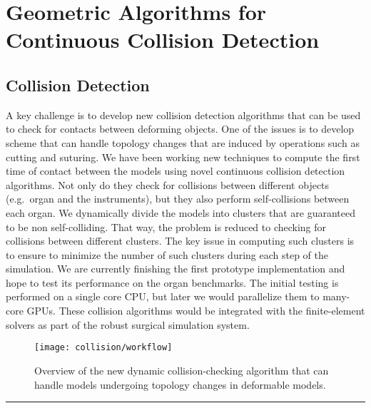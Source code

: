 
\section{Geometric Algorithms for Continuous Collision Detection}\label{sec:continuous_collision}

\subsection{Collision Detection}\label{ssec:collision_detection}
A key challenge is to develop new collision detection algorithms that can be used to check for contacts between deforming objects. One of the issues is to develop scheme that can handle topology changes that are induced by operations such as cutting and suturing. We have been working new techniques to compute the first time of contact between the models using novel continuous collision detection algorithms. Not only do they check for collisions between different objects (e.g.\ organ and the instruments), but they also perform self-collisions between each organ. We dynamically divide the models into clusters that are guaranteed to be non self-colliding. That way, the problem is reduced to checking for collisions between different clusters. The key issue in computing such clusters is to ensure to minimize the number of such clusters during each step of the simulation. We are currently finishing the first prototype implementation and hope to test its performance on the organ benchmarks. The initial testing is performed on a single core CPU, but later we would parallelize them to many-core GPUs. These collision algorithms would be integrated with the finite-element solvers as part of the robust surgical simulation system.

\begin{figure}
  \centering%
  \texttt{[image: collision/workflow]}
  \caption{Overview of the new dynamic collision-checking algorithm that can handle models undergoing topology changes in deformable models. }\label{fig:dynamic_collision}
\end{figure}

\hrule%

